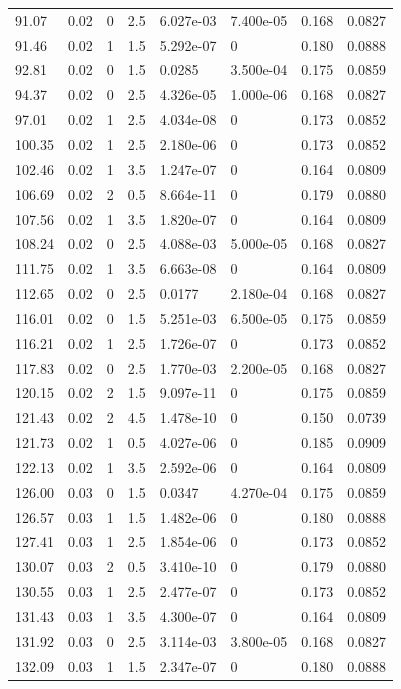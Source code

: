 \documentclass[preview]{standalone}
\begin{document}
{{{\begin{tabular}{L{1.2cm}C{1.2cm} C{0.3cm}C{0.5cm} C{1.4cm}C{1.4cm} C{1.4cm}C{1.4cm}}
  91.07  &  0.02  & 0     & 2.5 &  6.027e-03  & 7.400e-05  & 0.168 &  0.0827   \\ 
  91.46  &  0.02  & 1     & 1.5 &  5.292e-07  & 0  & 0.180 &  0.0888   \\ 
  92.81  &  0.02  & 0     & 1.5 &  0.0285  & 3.500e-04  & 0.175 &  0.0859   \\ 
  94.37  &  0.02  & 0     & 2.5 &  4.326e-05  & 1.000e-06  & 0.168 &  0.0827   \\ 
  97.01  &  0.02  & 1     & 2.5 &  4.034e-08  & 0  & 0.173 &  0.0852   \\ 
  100.35  &  0.02  & 1     & 2.5 &  2.180e-06  & 0  & 0.173 &  0.0852   \\ 
  102.46  &  0.02  & 1     & 3.5 &  1.247e-07  & 0  & 0.164 &  0.0809   \\ 
  106.69  &  0.02  & 2     & 0.5 &  8.664e-11  & 0  & 0.179 &  0.0880   \\ 
  107.56  &  0.02  & 1     & 3.5 &  1.820e-07  & 0  & 0.164 &  0.0809   \\ 
  108.24  &  0.02  & 0     & 2.5 &  4.088e-03  & 5.000e-05  & 0.168 &  0.0827   \\ 
  111.75  &  0.02  & 1     & 3.5 &  6.663e-08  & 0  & 0.164 &  0.0809   \\ 
  112.65  &  0.02  & 0     & 2.5 &  0.0177  & 2.180e-04  & 0.168 &  0.0827   \\ 
  116.01  &  0.02  & 0     & 1.5 &  5.251e-03  & 6.500e-05  & 0.175 &  0.0859   \\ 
  116.21  &  0.02  & 1     & 2.5 &  1.726e-07  & 0  & 0.173 &  0.0852   \\ 
  117.83  &  0.02  & 0     & 2.5 &  1.770e-03  & 2.200e-05  & 0.168 &  0.0827   \\ 
  120.15  &  0.02  & 2     & 1.5 &  9.097e-11  & 0  & 0.175 &  0.0859   \\ 
  121.43  &  0.02  & 2     & 4.5 &  1.478e-10  & 0  & 0.150 &  0.0739   \\ 
  121.73  &  0.02  & 1     & 0.5 &  4.027e-06  & 0  & 0.185 &  0.0909   \\ 
  122.13  &  0.02  & 1     & 3.5 &  2.592e-06  & 0  & 0.164 &  0.0809   \\ 
  126.00  &  0.03  & 0     & 1.5 &  0.0347  & 4.270e-04  & 0.175 &  0.0859   \\ 
  126.57  &  0.03  & 1     & 1.5 &  1.482e-06  & 0  & 0.180 &  0.0888   \\ 
  127.41  &  0.03  & 1     & 2.5 &  1.854e-06  & 0  & 0.173 &  0.0852   \\ 
  130.07  &  0.03  & 2     & 0.5 &  3.410e-10  & 0  & 0.179 &  0.0880   \\ 
  130.55  &  0.03  & 1     & 2.5 &  2.477e-07  & 0  & 0.173 &  0.0852   \\ 
  131.43  &  0.03  & 1     & 3.5 &  4.300e-07  & 0  & 0.164 &  0.0809   \\ 
  131.92  &  0.03  & 0     & 2.5 &  3.114e-03  & 3.800e-05  & 0.168 &  0.0827   \\ 
  132.09  &  0.03  & 1     & 1.5 &  2.347e-07  & 0  & 0.180 &  0.0888   \\ 
\hline 
\end{tabular} 

}}}
\end{document}
